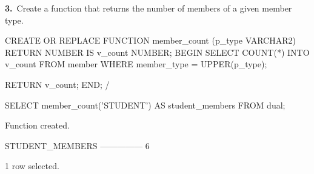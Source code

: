\noindent\begin{minipage}{\linewidth}
\begingroup{}
{\fontsize{14}{17}\selectfont\textbf{3.}}\ Create a function that returns the number of members of a given member type.\par
\endgroup\vspace{12pt}


\begin{sqlcode}
CREATE OR REPLACE FUNCTION member_count (p_type VARCHAR2)
RETURN NUMBER
IS
   v_count NUMBER;
BEGIN
   SELECT COUNT(*) INTO v_count
   FROM member
   WHERE member_type = UPPER(p_type);

   RETURN v_count;
END;
/

SELECT member_count('STUDENT') AS student_members FROM dual;
\end{sqlcode}

\vspace{18pt}


\begin{sqlout}[fontsize=\small]
Function created.

STUDENT_MEMBERS
---------------
              6

1 row selected.
\end{sqlout}
\end{minipage}\par\vspace{24pt}

